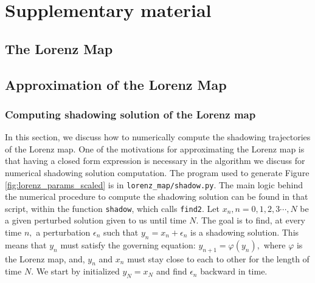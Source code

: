 \section{Supplementary material}
\subsection{The Lorenz Map}
\subsection{Approximation of the Lorenz Map}

\subsubsection{Computing shadowing solution of the Lorenz map}
In this section, we discuss how to numerically compute the shadowing trajectories of the Lorenz map. One of the motivations for approximating the Lorenz map is that having a closed form expression is necessary in the algorithm we discuss for numerical shadowing solution computation. The program used to generate Figure 
\ref{fig:lorenz_params_scaled} is in \verb+lorenz_map/shadow.py+. The main logic behind the numerical procedure to compute the shadowing solution can be found in that script, within the function \verb+shadow+, which calls \verb+find2+. Let $x_n, n = 0,1,2,3\cdots,N$ be a given perturbed solution given to us until time $N$. The goal is to find, at every time $n,$ a perturbation $\epsilon_n$ such that $y_n = x_n + \epsilon_n$ is a shadowing solution. This means that $y_n$ must satisfy the governing equation: $y_{n+1} = \varphi(y_n),$ where $\varphi$ is the Lorenz map, and, $y_n$ and $x_n$ must stay 
close to each to other for the length of time $N$. We start by initialized $y_N = x_N$ and find $\epsilon_n$ backward in time.